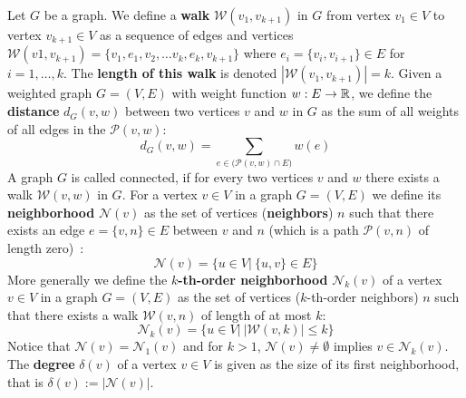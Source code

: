 \begin{frame}[allowframebreaks=0.9]
	Let $G$ be a graph. 
	We define a \textbf{walk} $\mathcal{W}(v_1, v_{k+1})$ in $G$ from vertex $v_1\in V$ to vertex $v_{k+1}\in V$ as a sequence of edges and vertices $\mathcal{W}(v1, v_{k+1}) = \{ v_1, e_1, v_2,\allowbreak\dots v_k, e_{k}, v_{k+1} \}$ where $e_i=\{v_i, v_{i+1}\}\in E$ for $i=1,\dots,k$. 
	The \textbf{length of this walk} is denoted $|\mathcal{W}(v_1, v_{k+1})|=k$.
	Given a weighted graph $G=(V,E)$ with weight function $w:E\to\mathbb{R}$, we define the \textbf{distance} $d_G(v,w)$ between two vertices $v$ and $w$ in $G$ as the sum of all weights of all edges in the $\mathcal{P}(v,w)$:
	\[ d_G(v,w) = \sum_{e\in \big( \mathcal{P}(v,w) \cap E\big) } w(e) \]
	A graph $G$ is called connected, if for every two vertices $v$ and $w$ there exists a walk $\mathcal{W}(v, w)$ in $G$.
	For a vertex $v\in V$ in a graph $G=(V, E)$ we define its \textbf{neighborhood} $\mathcal{N}(v)$ as the set of vertices (\textbf{neighbors}) $n$ such that there exists an edge $e=\{v, n\}\in E$ between $v$ and $n$ (which is a path $\mathcal{P}(v,n)$ of length zero)~\cite{2019_Togninalli_NIPS}:
	\[ \mathcal{N}(v) = \{ u\in V | \ \{u,v\}\in E  \} \]
	More generally we define the $k$\textbf{-th-order neighborhood} $\mathcal{N}_k(v)$ of a vertex $v\in V$ in a graph $G=(V, E)$ as the set of vertices ($k$-th-order neighbors) $n$ such that there exists a walk $\mathcal{W}(v,n)$ of length of at most $k$:
	\[ \mathcal{N}_k(v) = \{ u\in V | \ |\mathcal{W}(v, k)| \le k  \} \]
	Notice that $\mathcal{N}(v) = \mathcal{N}_1(v)$ and for $k>1$, $\mathcal{N}(v)\neq \emptyset$ implies $v\in \mathcal{N}_k(v)$.
	The \textbf{degree} $\delta(v)$ of a vertex $v \in V$ is given as the size of its first neighborhood, that is $\delta(v):= |\mathcal{N}(v)|$.\\
	

\end{frame}
